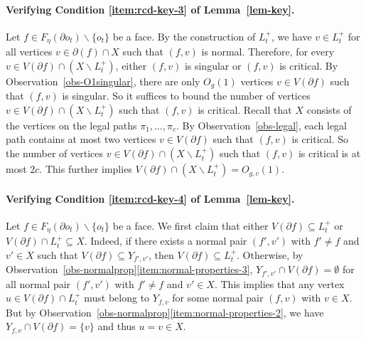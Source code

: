 \documentclass[a4paper,11pt]{article}
\numberwithin{lemma}{section}
\begin{document}
\paragraph{Verifying Condition \ref{item:rcd-key-3} of Lemma~\ref{lem-key}.}
Let $f \in F_\eta(\partial o_t) \backslash \{o_t\}$ be a face.
By the construction of $L_t^+$, we have $v \in L_t^+$ for all vertices $v \in \partial (f) \cap X$ such that $(f,v)$ is normal.
Therefore, for every $v \in V(\partial f) \cap (X \backslash L_t^+)$, either $(f,v)$ is singular or $(f,v)$ is critical.
By Observation~\ref{obs-O1singular}, there are only $O_g(1)$ vertices $v \in V(\partial f)$ such that $(f,v)$ is singular.
So it suffices to bound the number of vertices $v \in V(\partial f) \cap (X \backslash L_t^+)$ such that $(f,v)$ is critical.
Recall that $X$ consists of the vertices on the legal paths $\pi_1,\dots,\pi_c$.
By Observation~\ref{obs-legal}, each legal path contains at most two vertices $v \in V(\partial f)$ such that $(f,v)$ is critical.
So the number of vertices $v \in V(\partial f) \cap (X \backslash L_t^+)$ such that $(f,v)$ is critical is at most $2c$.
This further implies $V(\partial f) \cap (X \backslash L_t^+) = O_{g,c}(1)$.

\paragraph{Verifying Condition \ref{item:rcd-key-4} of Lemma~\ref{lem-key}.}
Let $f \in F_\eta(\partial o_t) \backslash \{o_t\}$ be a face.
We first claim that either $V(\partial f) \subseteq L_t^+$ or $V(\partial f) \cap L_t^+ \subseteq X$.
Indeed, if there exists a normal pair $(f',v')$ with $f' \neq f$ and $v' \in X$ such that $V(\partial f) \subseteq Y_{f',v'}$, then $V(\partial f) \subseteq L_t^+$.
Otherwise, by Observation~\ref{obs-normalprop}\ref{item:normal-properties-3}, $Y_{f',v'} \cap V(\partial f) = \emptyset$ for all normal pair $(f',v')$ with $f' \neq f$ and $v' \in X$.
This implies that any vertex $u \in V(\partial f) \cap L_t^+$ must belong to $Y_{f,v}$ for some normal pair $(f,v)$ with $v \in X$.
But by Observation~\ref{obs-normalprop}\ref{item:normal-properties-2}, we have $Y_{f,v} \cap V(\partial f) = \{v\}$ and thus $u = v \in X$.
\end{document}
